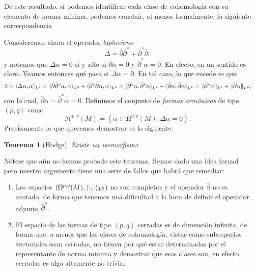 \documentclass[12pt,a4paper]{article}
\newtheorem{thm}{Teorema}[section]
\theoremstyle{definition} \newtheorem{defn}[thm]{Definición}
\theoremstyle{definition} \newtheorem{ejemplo}[thm]{Ejemplo}
\theoremstyle{definition} \newtheorem{ejercicio}[thm]{Ejercicio}
\theoremstyle{remark} \newtheorem*{obs}{Observación}
\DeclarePairedDelimiter\norm{\lVert}{\rVert}
\DeclarePairedDelimiter\esc{\langle}{\rangle}
\newcommand{\dol}{\bar{\partial}}
\newcommand{\HH}{\mathcal{H}}
\begin{document}
  De este resultado, si podemos identificar cada clase de cohomología con su elemento de norma mínima, podemos concluir, al menos formalmente, la siguiente correspondencia
  \begin{center}
  \end{center}
  Consideremos ahora el operador \emph{laplaciano}
  \begin{equation*}
    \Delta = \dol \dol^* + \dol^* \dol,
  \end{equation*}
  y notemos que $\Delta \alpha = 0$ si y sólo si $\dol \alpha = 0$ y $\dol^*\alpha =0$. En efecto, en un sentido es claro. Veamos entonces qué pasa si $\Delta \alpha = 0$. En tal caso, lo que sucede es que
  \begin{equation*}
    0 = \esc{\Delta \alpha, \alpha}_{L^2} = \esc{\dol \dol^* \alpha, \alpha}_{L^2} + \esc{\dol^* \dol \alpha, \alpha}_{L^2} = \esc{\dol^* \alpha, \dol^* \alpha}_{L^2} + \esc{\dol \alpha, \dol \alpha}_{L^2} = \norm{\dol^* \alpha}_{L^2} + \norm{\dol \alpha}_{L^2},
  \end{equation*}
  con lo cual, $\dol \alpha = \dol^*\alpha=0$. Definimos el conjunto de \emph{formas armónicas} de tipo $(p,q)$ como 
  \begin{equation*}
    \HH^{p,q}(M)=\left\{ \alpha \in \Omega^{p,q}(M) : \Delta \alpha=0 \right\}.   
  \end{equation*}
 Precisamente lo que queremos demostrar es lo siguiente:
 \begin{thm}[Hodge]
   Existe un isomorfismo
   \begin{center}
   \end{center}
 \end{thm}
   
 Nótese que aún no hemos probado este teorema. Hemos dado una idea formal pero nuestro argumento tiene una serie de fallos que habrá que remediar:
 \begin{enumerate}
   \item Los espacios $(\Omega^{p,q}(M),\esc{\cdot,\cdot}_{L^2})$ no son completos y el operador $\dol$ no es acotado, de forma que tenemos una dificultad a la hora de definir el operador adjunto $\dol^*$.
   \item El espacio de las formas de tipo $(p,q)$ cerradas es de dimensión infinita, de forma que, a menos que las clases de cohomología, vistas como subespacios vectoriales sean cerradas, no tienen por qué estar determinadas por el representante de norma mínima y demostrar que esas clases son, en efecto, cerradas es algo altamente no trivial.
 \end{enumerate}
\end{document}
